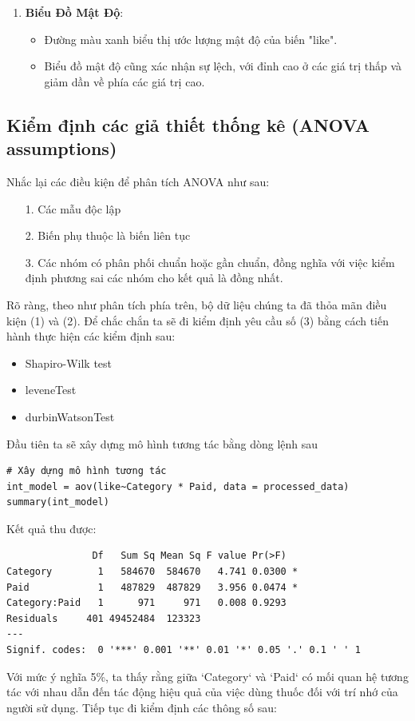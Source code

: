 \begin{itemize}
\begin{itemize}
\begin{enumerate}
            \item \textbf{Biểu Đồ Mật Độ}:
            \begin{itemize}
                \item Đường màu xanh biểu thị ước lượng mật độ của biến "like".
                \item Biểu đồ mật độ cũng xác nhận sự lệch, với đỉnh cao ở các giá trị thấp và giảm dần về phía các giá trị cao.
            \end{itemize}
\end{enumerate}

\end{itemize}

\subsection{Kiểm định các giả thiết thống kê (ANOVA assumptions)}
Nhắc lại các điều kiện để phân tích ANOVA như sau:
\begin{itemize}
    \item [1.] Các mẫu độc lập
    \item [2.] Biến phụ thuộc là biến liên tục
    \item [3.] Các nhóm có phân phối chuẩn hoặc gần chuẩn, đồng nghĩa với việc kiểm định phương sai các nhóm cho kết quả là đồng nhất.
\end{itemize}

Rõ ràng, theo như phân tích phía trên, bộ dữ liệu chúng ta đã thỏa mãn điều kiện (1) và (2). Để chắc chắn ta sẽ đi kiểm định yêu cầu số (3) bằng cách tiến hành thực hiện các kiểm định sau:
\begin{itemize}
    \item Shapiro-Wilk test
    \item leveneTest
    \item durbinWatsonTest
\end{itemize}

Đầu tiên ta sẽ xây dựng mô hình tương tác bằng dòng lệnh sau
\begin{lstlisting}
# Xây dựng mô hình tương tác
int_model = aov(like~Category * Paid, data = processed_data)
summary(int_model)
\end{lstlisting}

Kết quả thu được:

\begin{lstlisting}
               Df   Sum Sq Mean Sq F value Pr(>F)  
Category        1   584670  584670   4.741 0.0300 *
Paid            1   487829  487829   3.956 0.0474 *
Category:Paid   1      971     971   0.008 0.9293  
Residuals     401 49452484  123323                 
---
Signif. codes:  0 '***' 0.001 '**' 0.01 '*' 0.05 '.' 0.1 ' ' 1
\end{lstlisting}
Với mức ý nghĩa 5\%, ta thấy rằng giữa `Category` và `Paid` có mối quan hệ tương tác với nhau dẫn đến tác động hiệu quả của việc dùng thuốc đối với trí nhớ của người sử dụng. Tiếp tục đi kiểm định các thông số sau:


\end{itemize}
